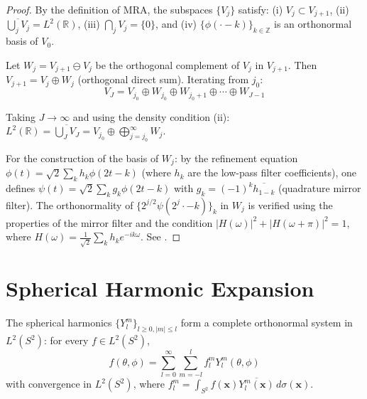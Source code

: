 \begin{proof}
By the definition of MRA, the subspaces $\{V_j\}$ satisfy: (i) $V_j \subset V_{j+1}$, (ii) $\overline{\bigcup_j V_j} = L^2(\mathbb{R})$, (iii) $\bigcap_j V_j = \{0\}$, and (iv) $\{\phi(\cdot - k)\}_{k \in \mathbb{Z}}$ is an orthonormal basis of $V_0$.

Let $W_j = V_{j+1} \ominus V_j$ be the orthogonal complement of $V_j$ in $V_{j+1}$. Then $V_{j+1} = V_j \oplus W_j$ (orthogonal direct sum). Iterating from $j_0$:
\[
V_J = V_{j_0} \oplus W_{j_0} \oplus W_{j_0+1} \oplus \cdots \oplus W_{J-1}
\]

Taking $J \to \infty$ and using the density condition (ii): $L^2(\mathbb{R}) = \overline{\bigcup_J V_J} = V_{j_0} \oplus \bigoplus_{j=j_0}^{\infty} W_j$.

For the construction of the basis of $W_j$: by the refinement equation $\phi(t) = \sqrt{2} \sum_k h_k \phi(2t - k)$ (where $h_k$ are the low-pass filter coefficients), one defines $\psi(t) = \sqrt{2} \sum_k g_k \phi(2t - k)$ with $g_k = (-1)^k \overline{h_{1-k}}$ (quadrature mirror filter). The orthonormality of $\{2^{j/2}\psi(2^j \cdot - k)\}_k$ in $W_j$ is verified using the properties of the mirror filter and the condition $|H(\omega)|^2 + |H(\omega + \pi)|^2 = 1$, where $H(\omega) = \frac{1}{\sqrt{2}} \sum_k h_k e^{-ik\omega}$. See \citep[Chapter~7]{Mallat2009}.
\end{proof}

\section{Spherical Harmonic Expansion}\label{sec:expansion_armonicos_esfericos}

\begin{theorem}\label{thm:expansion_armonicos_apendice}
The spherical harmonics $\{Y_l^m\}_{l \geq 0, |m| \leq l}$ form a complete orthonormal system in $L^2(S^2)$: for every $f \in L^2(S^2)$,
\[
f(\theta, \phi) = \sum_{l=0}^{\infty} \sum_{m=-l}^{l} f_l^m Y_l^m(\theta, \phi)
\]
with convergence in $L^2(S^2)$, where $f_l^m = \int_{S^2} f(\mathbf{x}) \overline{Y_l^m(\mathbf{x})} \, d\sigma(\mathbf{x})$.
\end{theorem}

